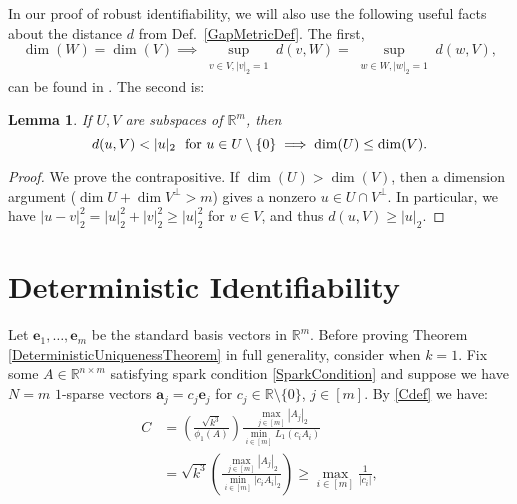 \documentclass[journal, twocolumn]{IEEEtran}
\newtheorem{lemma}{Lemma}
\begin{document}
In our proof of robust identifiability, we will also use the following useful facts about the distance $d$ from Def.~\ref{GapMetricDef}. The first, 
\begin{equation}\label{SubspaceMetricSameDim}
\dim(W) = \dim(V) \implies \sup_{\substack{v \in V, |v|_2 = 1}}  d(v,W)  = \sup_{\substack{w \in W, |w|_2 = 1}} d(w,V),
\end{equation}
can be found in \cite[Lemma 3.3]{Morris10}. The second is:
\begin{lemma}\label{MinDimLemma}
If $U, V$ are subspaces of $\mathbb{R}^{m}$, then
\begin{equation}\label{MinDim}
d(u,V) < |u|_2 \ \ \text{\rm for } u \in U \setminus{\{0\}} \implies \dim(U) \leq \dim(V).
\end{equation}
\end{lemma}

\begin{proof}
We prove the contrapositive.  If $\dim(U) > \dim(V)$, then a dimension argument ($\dim U + \dim V^\perp > m$) gives a nonzero $u \in U \cap V^\perp$.  In particular, we have $|u - v|_2^2 = |u|_2^2 + |v|_2^2 \geq |u|_2^2$ for $v \in V$, and thus $d(u,V) \geq |u|_2$.
\end{proof}

\section{Deterministic Identifiability}\label{DUT}

Let $\mathbf{e}_1, \ldots, \mathbf{e}_m$ be the standard basis vectors in $\mathbb R^m$.
Before proving Theorem \ref{DeterministicUniquenessTheorem} in full generality, consider when $k=1$. Fix some $A \in \mathbb{R}^{n \times m}$ satisfying spark condition \eqref{SparkCondition} and suppose we have $N = m$ $1$-sparse vectors $\mathbf{a}_j = c_j \mathbf{e}_j$ for $c_j \in \mathbb{R} \setminus \{0\}$, $j \in [m]$. By \eqref{Cdef} we have:
\begin{align}\label{C1}
C &= \left( \frac{ \sqrt{k^3}}{ \phi_1(A) } \right) \frac{\max_{j \in [m]} |A_j|_2}{\min_{i \in [m]} L_1(c_iA_i) } \\
&= \sqrt{k^3} \left( \frac{\max_{j \in [m]} |A_j|_2}{\min_{i \in [m]}|c_iA_i|_2} \right)
\geq \max_{i \in [m]} \frac{1}{|c_i|} , 
\end{align}
\end{document}
